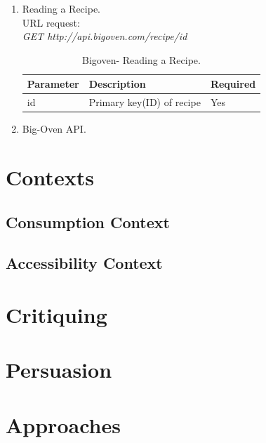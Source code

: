 \begin{enumerate}
	\item Reading a Recipe.\\
	URL request:\\
	\textit{GET http://api.bigoven.com/recipe/{id}}
	\begin{table}[ht]
		\centering %
		\begin{tabular}{p{3cm} p{6cm} p{3cm}}  %
			\hline\hline %
			Parameter & Description & Required \\ %
			\hline %
			id & Primary key(ID) of recipe & Yes \\ 
			\hline %
		\end{tabular}
		\caption{Bigoven- Reading a Recipe.}
		\label{table:bigoven-reading-recipe}
	\end{table}
	
	\item Big-Oven API.	
\end{enumerate}

\section{Contexts}

\subsection{Consumption Context}

\subsection{Accessibility Context}

\section{Critiquing}

\section{Persuasion}

\section{Approaches}
